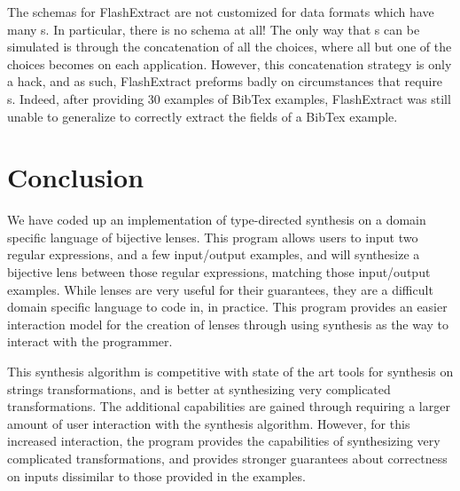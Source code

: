 \documentclass[numbers,10pt,preprint\ifanon ,nocopyrightspace\fi]{sigplanconf}
\begin{document}
The schemas for FlashExtract are not customized for data formats which have many
\OrRegexType{}s.  In particular, there is no \OrRegexType{} schema at all!  The
only way that \OrRegexType{}s can be simulated is through the concatenation of
all the choices, where all but one of the choices becomes  on each
application.  However, this concatenation strategy is only a hack, and as such,
FlashExtract preforms badly on
circumstances that require \OrRegexType{}s.
Indeed, after providing 30 examples of BibTex
examples, FlashExtract was still unable to generalize to correctly extract
the fields of a BibTex example.

\section{Conclusion}

We have coded up an implementation of type-directed synthesis on a domain
specific language of bijective lenses.  This program allows users to input two
regular expressions, and a few input/output examples, and will synthesize a
bijective lens between those regular expressions, matching those input/output
examples.  While lenses are very useful for their guarantees, they are a
difficult domain specific language to code in, in practice.  This program
provides an easier interaction model for the creation of lenses through using
synthesis as the way to interact with the programmer.

This synthesis algorithm is competitive with state of the art tools for
synthesis on strings transformations, and is better at synthesizing very
complicated transformations.  The additional capabilities are gained through requiring a
larger amount of user interaction with the synthesis algorithm.  However,
for this increased interaction, the program provides the capabilities of
synthesizing very complicated transformations, and provides stronger guarantees
about correctness on inputs dissimilar to those provided in the
examples.


\end{document}
